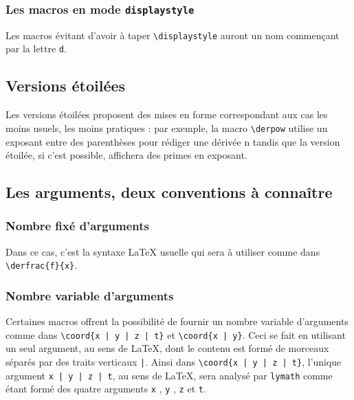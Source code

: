 \documentclass[12pt,a4paper]{article}
\newcommand\env[1]{\texttt{#1}}
\newcommand\macro[1]{\env{\textbackslash{}#1}}
\theoremstyle{definition}
\begin{document}


\subsubsection{Les macros en mode \texttt{displaystyle}}

Les macros évitant d'avoir à taper \macro{displaystyle} auront un nom commençant par la lettre \verb+d+.




\subsection{Versions étoilées}

Les versions étoilées proposent des mises en forme correspondant aux cas les moins usuels, les moins pratiques : par exemple, la macro \macro{derpow} utilise un exposant entre des parenthèses pour rédiger une dérivée n\ieme{} tandis que la version étoilée, si c'est possible, affichera des primes en exposant.




\subsection{Les arguments, deux conventions à connaître}

\subsubsection{Nombre fixé d'arguments}

Dans ce cas, c'est la syntaxe \LaTeX{} usuelle qui sera à utiliser comme dans \macro{derfrac\{f\}\{x\}}.




\subsubsection{Nombre variable d'arguments}

Certaines macros offrent la possibilité de fournir un nombre variable d'arguments comme dans \macro{coord\{x | y | z | t\}} et \macro{coord\{x | y\}}.
Ceci se fait en utilisant un seul argument, au sens de \LaTeX{}, dont le contenu est formé de morceaux séparés par des traits verticaux \verb+|+.
Ainsi dans \macro{coord\{x | y | z | t\}}, l'unique argument \verb+x | y | z | t+, au sens de \LaTeX{}, sera analysé par \verb+lymath+ comme étant formé des quatre arguments \verb+x+ , \verb+y+ , \verb+z+ et \verb+t+.
\end{document}
